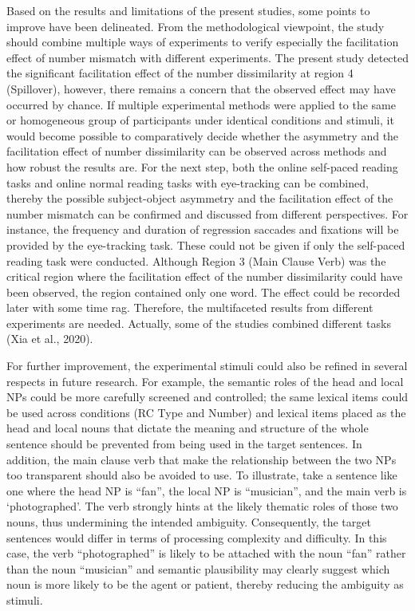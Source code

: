 \documentclass[
]{article}
\begin{document}
Based on the results and limitations of the present studies, some points
to improve have been delineated. From the methodological viewpoint, the
study should combine multiple ways of experiments to verify especially
the facilitation effect of number mismatch with different experiments.
The present study detected the significant facilitation effect of the
number dissimilarity at region 4 (Spillover), however, there remains a
concern that the observed effect may have occurred by chance. If
multiple experimental methods were applied to the same or homogeneous
group of participants under identical conditions and stimuli, it would
become possible to comparatively decide whether the asymmetry and the
facilitation effect of number dissimilarity can be observed across
methods and how robust the results are. For the next step, both the
online self-paced reading tasks and online normal reading tasks with
eye-tracking can be combined, thereby the possible subject-object
asymmetry and the facilitation effect of the number mismatch can be
confirmed and discussed from different perspectives. For instance, the
frequency and duration of regression saccades and fixations will be
provided by the eye-tracking task. These could not be given if only the
self-paced reading task were conducted. Although Region 3 (Main Clause
Verb) was the critical region where the facilitation effect of the
number dissimilarity could have been observed, the region contained only
one word. The effect could be recorded later with some time rag.
Therefore, the multifaceted results from different experiments are
needed. Actually, some of the studies combined different tasks (Xia et
al., 2020).

For further improvement, the experimental stimuli could also be refined
in several respects in future research. For example, the semantic roles
of the head and local NPs could be more carefully screened and
controlled; the same lexical items could be used across conditions (RC
Type and Number) and lexical items placed as the head and local nouns
that dictate the meaning and structure of the whole sentence should be
prevented from being used in the target sentences. In addition, the main
clause verb that make the relationship between the two NPs too
transparent should also be avoided to use. To illustrate, take a
sentence like one where the head NP is ``fan'', the local NP is
``musician'', and the main verb is `photographed'. The verb strongly
hints at the likely thematic roles of those two nouns, thus undermining
the intended ambiguity. Consequently, the target sentences would differ
in terms of processing complexity and difficulty. In this case, the verb
``photographed'' is likely to be attached with the noun ``fan'' rather
than the noun ``musician'' and semantic plausibility may clearly suggest
which noun is more likely to be the agent or patient, thereby reducing
the ambiguity as stimuli.
\end{document}
